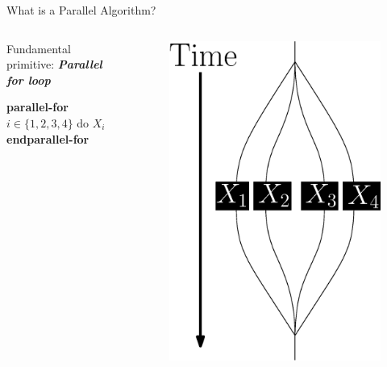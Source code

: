 \documentclass[xcolor=x11names, svgnames, rgb]{beamer}
\newcommand{\defn}[1]       {{\textit{\textbf{\boldmath #1}}}}
\begin{document}
\begin{frame}[t]{What is a Parallel Algorithm?}

	\begin{columns}[T] %
	\begin{column}{.45\textwidth}
	Fundamental primitive: \defn{Parallel for loop}
	\vspace{1cm}
	\begin{algorithmic}
		\State \textbf{parallel-for} $i \in \{1,2,3,4\}$
		\State \hskip0.7cm do $X_i$
		\State \textbf{endparallel-for}

\end{algorithmic}

	\end{column}
	\hfill
	\begin{column}{.60\textwidth}
	\begin{figure}
		\includegraphics[width=0.75\linewidth]{imgs/altParallelForLoop.eps}
	\end{figure}
	\end{column}
	\end{columns}

\end{frame}
\end{document}
